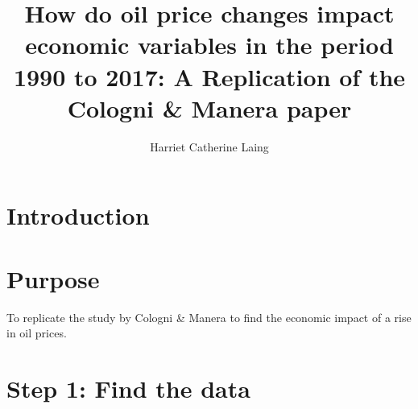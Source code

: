 \documentclass[11pt,preprint, authoryear]{elsarticle}
\numberwithin{equation}{section}
\numberwithin{figure}{section}
\numberwithin{table}{section}
\begin{document}
\begin{frontmatter}  %

\title{How do oil price changes impact economic variables in the period
1990 to 2017: A Replication of the Cologni \& Manera paper}





\author[Add1]{Harriet Catherine Laing}





\address[Add1]{Stellenbosch University, Stellenbosch, South Africa}



\vspace{1cm}





\vspace{0.5cm}

\end{frontmatter}



\pagestyle{fancy}
\chead{}
\rhead{}
\lfoot{}
\lhead{}
\cfoot{}


\headsep 35pt %




\hypertarget{introduction}{%
\section{\texorpdfstring{Introduction
\label{Introduction}}{Introduction }}\label{introduction}}

\hypertarget{purpose}{%
\section{Purpose}\label{purpose}}

To replicate the study by Cologni \& Manera to find the economic impact
of a rise in oil prices.

\hypertarget{step-1-find-the-data}{%
\section{Step 1: Find the data}\label{step-1-find-the-data}}
\end{document}
